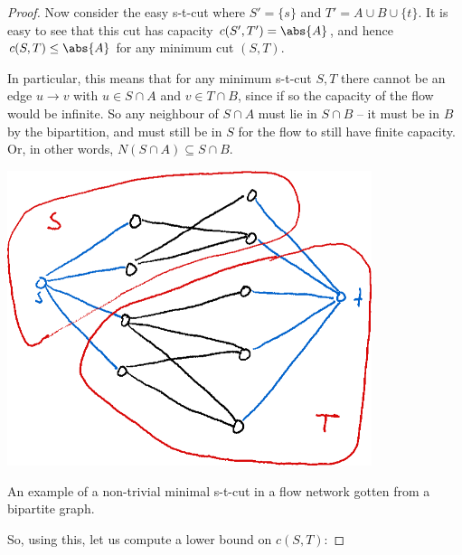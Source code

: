 \documentclass[nobib]{tufte-handout}
\begin{document}
\begin{theorem}
\begin{proof}
        Now consider the easy s-t-cut where $S' = \{s\}$ and $T' = A \cup B \cup \{t\}$. It is easy to see that this cut has capacity $c(S',T') = \abs{A}$, and hence $c(S,T) \leq \abs{A}$ for any minimum cut $(S,T)$.

        In particular, this means that for any minimum s-t-cut $S,T$ there cannot be an edge $u\to v$ with $u\in S\cap A$ and $v \in T \cap B$, since if so the capacity of the flow would be infinite. So any neighbour of $S\cap A$ must lie in $S\cap B$ -- it must be in $B$ by the bipartition, and must still be in $S$ for the flow to still have finite capacity. Or, in other words, $N(S \cap A) \subseteq S \cap B$.

        \begin{marginfigure}[-2cm]
            \centering
            \includegraphics[width=0.8\textwidth]{graphics/L7_flows/bipartite_s_t_cut.png}
            \caption{An example of a non-trivial minimal s-t-cut in a flow network gotten from a bipartite graph.}
            \label{fig:bipartite_s_t_cut}
        \end{marginfigure}

        So, using this, let us compute a lower bound on $c(S,T)$:
\end{proof}
\end{theorem}
\end{document}

